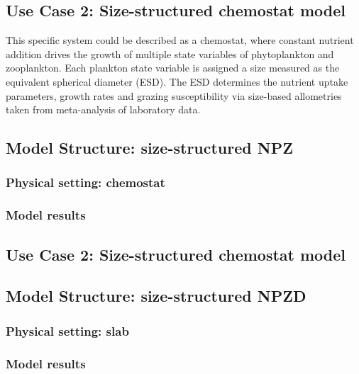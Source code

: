 \documentclass[journal abbreviation, manuscript]{copernicus}
\begin{document}
\subsection{Use Case 2: Size-structured chemostat model}

This specific system could be described as a chemostat, where constant nutrient addition drives the growth of multiple state variables of phytoplankton and zooplankton. Each plankton state variable is assigned a size measured as the equivalent spherical diameter (ESD). The ESD determines the nutrient uptake parameters, growth rates and grazing susceptibility via size-based allometries taken from meta-analysis of laboratory data.

\subsection{Model Structure: size-structured NPZ}

\subsubsection{Physical setting: chemostat}


\subsubsection{Model results}


\subsection{Use Case 2: Size-structured chemostat model}

\subsection{Model Structure: size-structured NPZD}



\subsubsection{Physical setting: slab}

\subsubsection{Model results}


\clearpage
\end{document}
